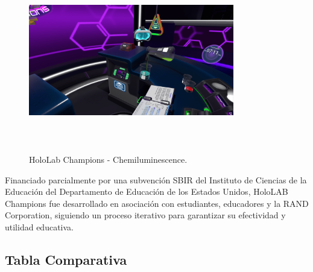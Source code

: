 \begin{figure}[thbp]
    \centering
    \includegraphics[width=0.8\textwidth, height=8cm]{img/chapter01/hololab-champions_pouring-min.png}
    \caption{HoloLab Champions - Chemiluminescence.}\label{fig:Esquema}
\end{figure}

Financiado parcialmente por una subvención SBIR del Instituto de Ciencias de la Educación del Departamento de Educación de los Estados Unidos, HoloLAB Champions fue desarrollado en asociación con estudiantes, educadores y la RAND Corporation, siguiendo un proceso iterativo para garantizar su efectividad y utilidad educativa.

\newpage
\subsection{Tabla Comparativa}

